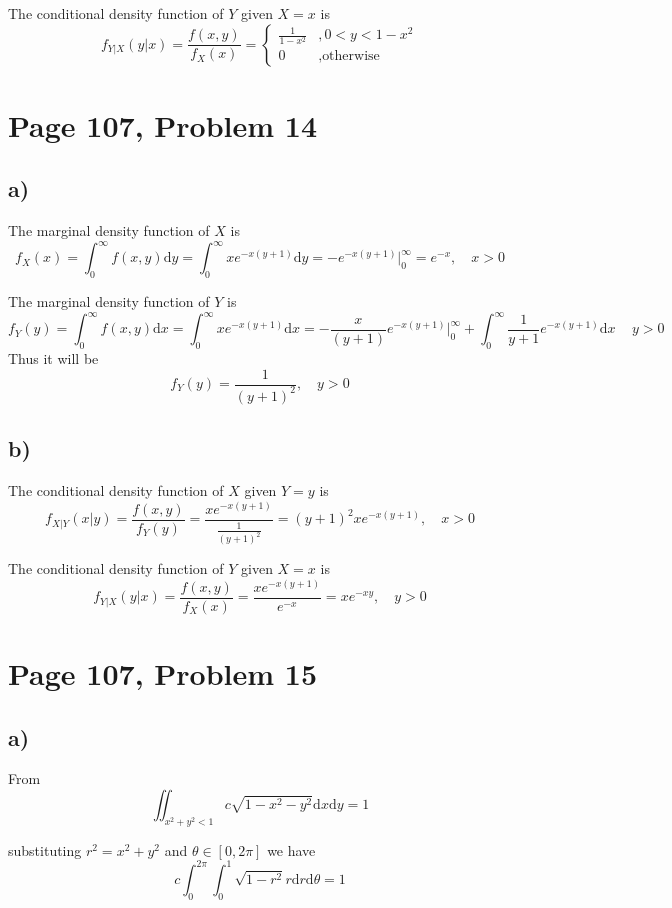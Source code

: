 \documentclass[a4paper, UTF-8]{article}
\theoremstyle{plain}
\begin{document}
The conditional density function of $Y$ given $X = x$ is
$$
f_{Y|X}(y|x) = \frac{f(x,y)}{f_X(x)} = \begin{cases}
\frac{1}{1-x^2} &, 0 < y < 1-x^2\\
0 &, \text{otherwise}
\end{cases}
$$

\section{Page 107, Problem 14} 

\subsection{a)} 

The marginal density function of $X$ is
$$
f_X(x) = \int_{0}^\infty f(x,y) \mathrm{d}y = \int_{0}^\infty xe^{-x(y+1)} \mathrm{d}y = -e^{-x(y + 1)} \big|_{0}^\infty = e^{-x}, \quad x > 0
$$

The marginal density function of $Y$ is
$$
f_Y(y) = \int_{0}^\infty f(x,y) \mathrm{d}x = \int_{0}^\infty xe^{-x(y+1)} \mathrm{d}x = -\frac{x}{(y+1)}e^{-x(y+1)}\big|_{0}^\infty + \int_{0}^\infty \frac{1}{y+1}e^{-x(y+1)} \mathrm{d}x\, \quad y > 0
$$
Thus it will be 
$$
f_Y(y) = \frac{1}{(y+1)^2} , \quad y > 0
$$

\subsection{b)} 

The conditional density function of $X$ given $Y = y$ is
$$
f_{X|Y}(x|y) = \frac{f(x,y)}{f_Y(y)} = \frac{xe^{-x(y+1)}}{\frac{1}{(y+1)^2}} = (y + 1)^2 xe^{-x(y+1)}, \quad x > 0
$$

The conditional density function of $Y$ given $X = x$ is
$$
f_{Y|X}(y|x) = \frac{f(x,y)}{f_X(x)} = \frac{xe^{-x(y+1)}}{e^{-x}} = xe^{-xy}, \quad y > 0
$$

\section{Page 107, Problem 15} 

\subsection{a)} 

From 
$$
\iint_{x^2 + y^2 < 1} c\sqrt{1 - x^2 - y^2  } \mathrm{d}x \mathrm{d}y = 1
$$

substituting $r^2 = x^2 + y^2$ and $\theta \in [0, 2\pi]$ we have 
$$
c \int_{0}^{2\pi} \int_{0}^1 \sqrt{1 - r^2} r \mathrm{d}r \mathrm{d}\theta = 1
$$
\end{document}
